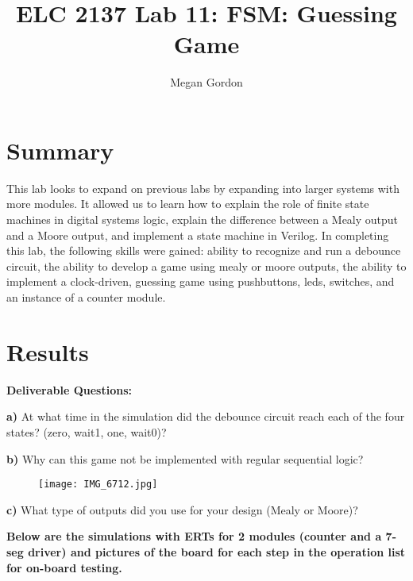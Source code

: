 \documentclass[11pt]{article}
\begin{document}
\title{ELC 2137 Lab 11: FSM: Guessing Game}
\author{Megan Gordon}

\maketitle


\section*{Summary}

This lab looks to expand on previous labs by expanding into larger systems with more modules. It allowed us to learn how to explain the role of finite state machines in digital systems logic, explain the difference between a Mealy output and a Moore output, and implement a state machine in Verilog. In completing this lab, the following skills were gained: ability to recognize and run a debounce circuit, the ability to develop a game using mealy or moore outputs, the ability to implement a clock-driven, guessing game using pushbuttons, leds, switches, and an instance of a counter module. 



\section*{Results}

\textbf{Deliverable Questions:}

\medskip
\textbf{a)} At what time in the simulation did the debounce circuit reach each of the four states? (zero, wait1, one, wait0)?


\textbf{b)} Why can this game not be implemented with regular sequential logic?
\begin{figure}[ht]\centering
	\texttt{[image: IMG\_6712.jpg]}
\end{figure}

\textbf{c)} What type of outputs did you use for your design (Mealy or Moore)? 

\clearpage

\textbf{Below are the simulations with ERTs for 2 modules (counter and a 7-seg driver) and pictures of the board for each step in the operation list for on-board testing.} 
\bigskip
\bigskip
\bigskip
\end{document}

